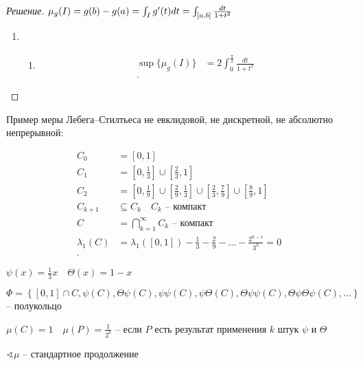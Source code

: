 \begin{proof}
    [Решение]

    $\mu_g(I) = g(b) -g(a) = \int_I g^{\prime}(t)dt = \int_{[a,b]}\frac{dt}{1 + t^2}$

    \begin{enumerate}
        \item 
        \begin{enumerate}
            \item \begin{align*}    
                \sup \{\mu_g(I)\} &= 2 \int_0^{\frac{\pi}{2}} \frac{dt}{1 + t ^2}\\
            .\end{align*}
        \end{enumerate}
    \end{enumerate}
\end{proof}

\begin{example}
    Пример меры Лебега--Стилтьеса 
    не евклидовой, не дискретной, не абсолютно непрерывной:

    \begin{align*}
        C_0 &= \left[0,1\right]\\
        C_1 &= \left[0, \frac{1}{3}\right] \cup \left[\frac{2}{3}, 1\right] \\
        C_2 &= \left[0, \frac{1}{9}\right] \cup \left[\frac{2}{9}, \frac{1}{3}\right] \cup \left[\frac{2}{3}, \frac{7}{9}\right] \cup \left[\frac{8}{9}, 1\right]  \\
        C_{k+1} &\subseteq C_k\quad C_k \text{ -- компакт}\\
        C &= \bigcap\limits_{k=1}^{\infty}C_k \text{ -- компакт}  \\
        \lambda_1(C) &= \lambda_1([0,1]) - \frac{1}{3} - \frac{2}{9}  - \ldots - \frac{2^{k-1}}{3^k} = 0\\
    .\end{align*}  

    $\psi(x) = \frac{1}{3}x\quad \Theta(x) = 1-x$
    
    \[\Phi = \left\{ [0,1] \cap C, \psi(C), \Theta\psi(C), \psi \psi(C), \psi\Theta(C), \Theta\psi\psi(C) , \Theta\psi\Theta\psi(C), \ldots \right\} \] 
    -- полукольцо

    $\mu(C) = 1\quad \mu(P) = \frac{1}{2^k}$ -- если $P$ есть результат применения $k$ штук $\psi$ и $\Theta$

    $\sphericalangle \mu$ -- стандартное продолжение
\end{example}

